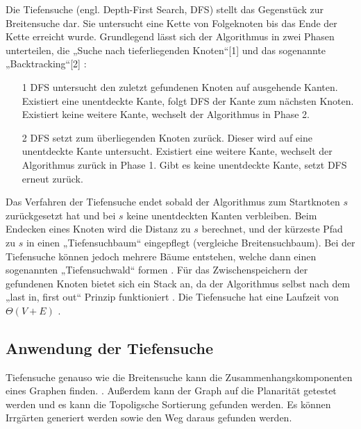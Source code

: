 Die Tiefensuche (engl. Depth-First Search, DFS) stellt das Gegenstück zur Breitensuche dar. Sie untersucht eine Kette von Folgeknoten bis das Ende der Kette erreicht wurde. Grundlegend lässt sich der Algorithmus in zwei Phasen unterteilen, die „Suche nach tieferliegenden Knoten“[1] und das sogenannte „Backtracking“[2] \cite{Tarjan.1972}:
\begin{itemize}
	\item[1] DFS untersucht den zuletzt gefundenen Knoten auf ausgehende Kanten. Existiert eine unentdeckte Kante, folgt DFS der Kante zum nächsten Knoten. Existiert keine weitere Kante, wechselt der Algorithmus in Phase 2.
	\item[2] DFS setzt zum überliegenden Knoten zurück. Dieser wird auf eine unentdeckte Kante untersucht. Existiert eine weitere Kante, wechselt der Algorithmus zurück in Phase 1. Gibt es keine unentdeckte Kante, setzt DFS erneut zurück.
\end{itemize}
Das Verfahren der Tiefensuche endet sobald der Algorithmus zum Startknoten $s$ zurückgesetzt hat und bei $s$ keine unentdeckten Kanten verbleiben. Beim Endecken eines Knoten wird die Distanz zu $s$ berechnet, und der kürzeste Pfad zu $s$ in einen „Tiefensuchbaum“ eingepflegt (vergleiche Breitensuchbaum). Bei der Tiefensuche können jedoch mehrere Bäume entstehen, welche dann einen sogenannten „Tiefensuchwald“ formen \cite{Cormen.2009}. 
Für das Zwischenspeichern der gefundenen Knoten bietet sich ein Stack an, da der Algorithmus selbst nach dem „last in, first out“ Prinzip funktioniert \cite{Tarjan.1972}. Die Tiefensuche hat eine Laufzeit von $\Theta(V + E)$ \cite{Cormen.2009}.


\subsection{Anwendung der Tiefensuche}
Tiefensuche genauso wie die Breitensuche kann die Zusammenhangskomponenten eines Graphen finden. \cite{schmitz} \cite{dfs}. Außerdem kann der Graph auf die Planarität \cite{dfsPlanar} getestet werden und es kann die Topoligsche Sortierung gefunden werden. Es können Irrgärten generiert werden sowie den Weg daraus gefunden werden\cite{examMaze}. %


